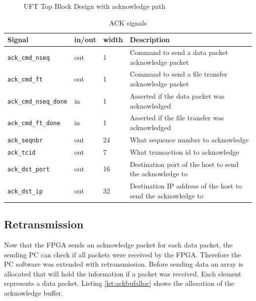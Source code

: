 \begin{figure}[t!]
    \centering
    \begin{adjustbox}{max width=\textwidth}
        
    \end{adjustbox}
    \caption{UFT Top Block Design with acknowledge path}
    \label{fig:ufttop}
\end{figure}


\begin{table}[tb!]
    \centering
    \begin{tabular}{l l l p{8.5cm}}
        \toprule
        Signal & in/out & width & Description \\
        \midrule
        \texttt{ack\_cmd\_nseq} & out & 1 &
        Command to send a data packet acknowledge packet
        \\
        \texttt{ack\_cmd\_ft} & out &1 &
        Command to send a file transfer acknowledge packet
        \\
        \texttt{ack\_cmd\_nseq\_done} & in &1 &
        Asserted if the data packet was acknowledged
        \\
        \texttt{ack\_cmd\_ft\_done} & in &1 &
        Asserted if the file transfer was acknowledged
        \\
        \texttt{ack\_seqnbr} & out & 24 &
        What sequence number to acknowledge
        \\
        \texttt{ack\_tcid} & out & 7 &
        What transaction id to acknowledge
        \\
        \texttt{ack\_dst\_port} & out & 16 &
        Destination port of the host to send the acknowledge to
        \\
        \texttt{ack\_dst\_ip} & out & 32 &
        Destination IP address of the host to send the acknowledge to
        \\
        \bottomrule
    \end{tabular}
    \caption{ACK signals}
    \label{tab:acksignals}
\end{table}

\subsection{Retransmission}
Now that the FPGA sends an acknowledge packet for each data packet, the sending
PC can check if all packets were received by the FPGA. Therefore the PC software
was extended with retransmission. Before sending data an array is allocated that
will hold the information if a packet was received. Each element represents a
data packet. Listing \ref{lst:ackbufalloc} shows the allocation of the
acknowledge buffer.

